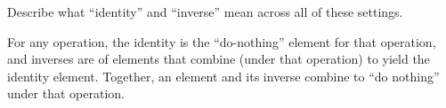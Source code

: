 \documentclass[space,nooutcomes]{ximera}
\begin{document}
\begin{question}
Describe what ``identity'' and ``inverse'' mean across all of these settings.  
\begin{freeResponse}
\begin{hint}
For any operation, the identity is the ``do-nothing'' element for that operation, and inverses are  of elements that combine (under that operation) to yield the identity element. Together, an element and its inverse combine to ``do nothing'' under that operation.  
\end{hint}
\end{freeResponse}
\end{question}
\end{document}
